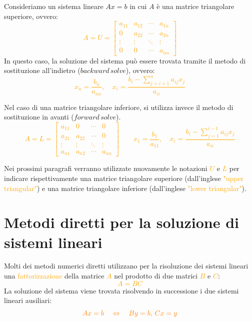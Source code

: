 \begin{defi}
Consideriamo un sistema lineare $Ax = b$ in cui $A$ è una matrice triangolare superiore, ovvero:
\textcolor{orange}{\[
A = U = \begin{bmatrix}
a_{11} & a_{12} & \cdots & a_{1n} \\
0 & a_{22} & \cdots & a_{2n} \\
\vdots & \vdots & \ddots & \vdots \\
0 & 0 & \cdots & a_{nn}
\end{bmatrix}
\]}
In questo caso, la soluzione del sistema può essere trovata tramite il metodo di sostituzione all'indietro ($backward \, solve$), ovvero:
\textcolor{orange}{\[
x_n = \frac{b_n}{a_{nn}}, \quad x_i = \frac{b_i - \sum_{j=i+1}^n a_{ij}x_j}{a_{ii}}
\]}

Nel caso di una matrice triangolare inferiore, si utilizza invece il metodo di sostituzione in avanti ($forward \, solve$).
\textcolor{orange}{\[
A = L =\begin{bmatrix}
a_{11} & 0 & \cdots & 0 \\
a_{21} & a_{22} & \cdots & 0 \\
\vdots & \vdots & \ddots & \vdots \\
a_{n1} & a_{n2} & \cdots & a_{nn}
\end{bmatrix}
\qquad
 x_1=\frac{b_1}{a_{11}}, \quad x_i = \frac{b_i - \sum_{j=1}^{i-1} a_{ij}x_j}{a_{ii}}
\]}
\end{defi}

\begin{obs}
Nei prossimi paragrafi verranno utilizzate nuovamente le notazioni \textcolor{orange}{$U$} e \textcolor{orange}{$L$}
per indicare rispettivamente una matrice triangolare superiore (dall'inglese \textcolor{orange}{"upper triangular"}) e una matrice triangolare inferiore (dall'inglese \textcolor{orange}{"lower triangular"}).
\end{obs}

\section{Metodi diretti per la soluzione di sistemi lineari}
Molti dei metodi numerici diretti utilizzano per la risoluzione dei sistemi lineari
una \textcolor{orange}{fattorizzazione} della matrice \textcolor{orange}{$A$} nel prodotto 
di due matrici \textcolor{orange}{$B$} e \textcolor{orange}{$C$}:
\textcolor{orange}{\[A = BC\]}
La soluzione del sistema viene trovata risolvendo in successione i due sistemi lineari ausiliari:
\[
\textcolor{orange}{Ax = b \quad \Leftrightarrow \quad By = b, \, Cx = y}
\]

